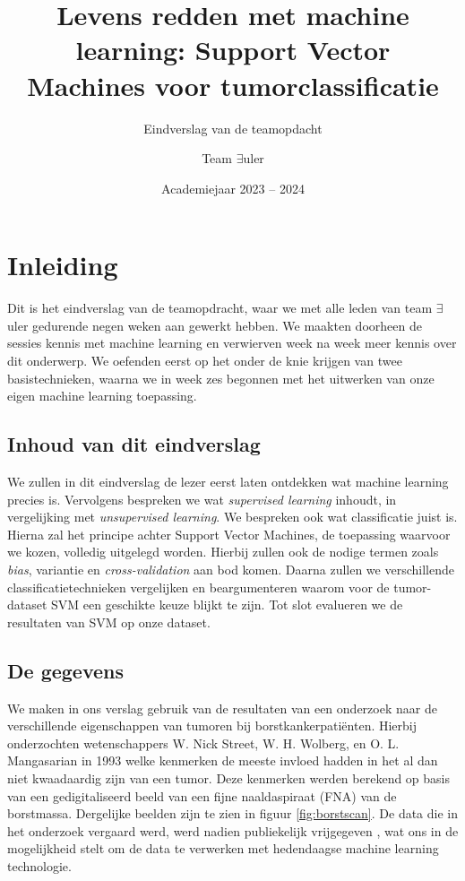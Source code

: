 \documentclass[twoside, kulak]{kulakreport}
\title{Levens redden met machine\\ learning: Support Vector\\ Machines voor tumorclassificatie}
\subtitle{Eindverslag van de teamopdacht}
\author{Team $\exists$uler}
\date{Academiejaar 2023 -- 2024}
\institute{Vincent Van Schependom, Daan Vanhaverbeke, Jasper Benoit, Lasha Shergelashvili, Marie Taillieu, Zeineb Kharbach, Florian Degraeve, \\Younes Mebarki}
\begin{document}
	
	\titlepage
	
	\tableofcontents
	
	\chapter*{Inleiding}
	
	Dit is het eindverslag van de teamopdracht, waar we met alle leden van team \(\exists\)uler gedurende negen weken aan gewerkt hebben. We maakten doorheen de sessies kennis met machine learning en verwierven week na week meer kennis over dit onderwerp. We oefenden eerst op het onder de knie krijgen van twee basistechnieken, waarna we in week zes begonnen met het uitwerken van onze eigen machine learning toepassing.
	
	\section*{Inhoud van dit eindverslag}
	
	We zullen in dit eindverslag de lezer eerst laten ontdekken wat machine learning precies is. Vervolgens bespreken we wat \textit{supervised learning} inhoudt, in vergelijking met \textit{unsupervised learning}. We bespreken ook wat classificatie juist is. Hierna zal het principe achter Support Vector Machines, de toepassing waarvoor we kozen, volledig uitgelegd worden. Hierbij zullen ook de nodige termen zoals \textit{bias}, variantie en \textit{cross-validation} aan bod komen. Daarna zullen we verschillende classificatietechnieken vergelijken en beargumenteren waarom voor de tumor-dataset SVM een geschikte keuze blijkt te zijn. Tot slot evalueren we de resultaten van SVM op onze dataset.
	
	\section*{De gegevens}
	
	We maken in ons verslag gebruik van de resultaten van een onderzoek naar de verschillende eigenschappen van tumoren bij borstkankerpatiënten. Hierbij onderzochten wetenschappers W. Nick Street, W. H. Wolberg, en O. L. Mangasarian \cite{tumoronderzoek} in 1993 welke kenmerken de meeste invloed hadden in het al dan niet kwaadaardig zijn van een tumor. Deze kenmerken werden berekend op basis van een gedigitaliseerd beeld van een fijne naaldaspiraat (FNA) van de borstmassa. Dergelijke beelden zijn te zien in figuur \ref{fig:borstscan}. De data die in het onderzoek vergaard werd, werd nadien publiekelijk vrijgegeven \cite{tumordataset}, wat ons in de mogelijkheid stelt om de data te verwerken met hedendaagse machine learning technologie.
	
\end{document}
